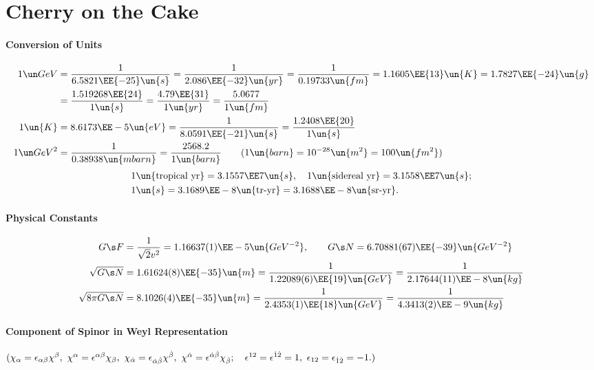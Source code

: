 
\section{Cherry on the Cake}
\paragraph{Conversion of Units}
\begin{align}
 1\GeV &= \frac1{6.5821\EE{-25}\un{s}} = \frac1{2.086\EE{-32}\un{yr}}
        = \frac1{0.19733\un{fm}}  = 1.1605\EE{13}\un{K} = 1.7827\EE{-24}\un{g}\notag\\
       &= \frac{1.519268\EE{24}}{1\un{s}} = \frac{4.79\EE{31}}{1\un{yr}}
        = \frac{5.0677}{1\un{fm}}\\
1\un{K}&= 8.6173\EE-5\un{eV} = \frac1{8.0591\EE{-21}\un{s}} = \frac{1.2408\EE{20}}{1\un{s}}\\
1\GeV^2&= \frac1{0.38938\un{mbarn}} = \frac{2568.2}{1\un{barn}}\qquad(1\un{barn}=10^{-28}\un{m^2} = 100\un{fm^2})
\end{align}
\vspace{-2zw}
\begin{equation}\begin{split}
 &1\un{\text{tropical yr}} = 3.1557\EE7\un{s},\quad 1\un{\text{sidereal yr}} = 3.1558\EE7\un{s};\\
 &1\un{s} = 3.1689\EE-8\un{\text{tr-yr}} = 3.1688\EE-8\un{\text{sr-yr}}.
\end{split}\end{equation}
\paragraph{Physical Constants}
\begin{align}
 G\s F &= \frac{1}{\sqrt2v^2} = 1.16637(1)\EE-5\un{GeV^{-2}},\qquad
 G\s N = 6.70881(67)\EE{-39}\un{GeV^{-2}}\\
 \sqrt{G\s N} &= 1.61624(8)\EE{-35}\un{m} = \frac1{1.22089(6)\EE{19}\un{GeV}}
               = \frac1{2.17644(11)\EE-8\un{kg}}\\
 \sqrt{8\pi G\s N}&= 8.1026(4)\EE{-35}\un{m} = \frac1{2.4353(1)\EE{18}\un{GeV}}
                   = \frac1{4.3413(2)\EE-9\un{kg}}
\end{align}
\paragraph{Component of Spinor in Weyl Representation}
$(\chi_\alpha=\epsilon_{\alpha\beta}\chi^\beta,\
  \chi^\alpha=\epsilon^{\alpha\beta}\chi_\beta,\
  \chi_{\dot\alpha}=\epsilon_{{\dot\alpha}{\dot\beta}}\chi^{\dot\beta},\
  \chi^{\dot\alpha}=\epsilon^{{\dot\alpha}{\dot\beta}}\chi_{\dot\beta};\quad
  \epsilon^{12}=\epsilon^{\dot1\dot2}=1, \
  \epsilon_{12}=\epsilon_{\dot1\dot2}=-1.)$

